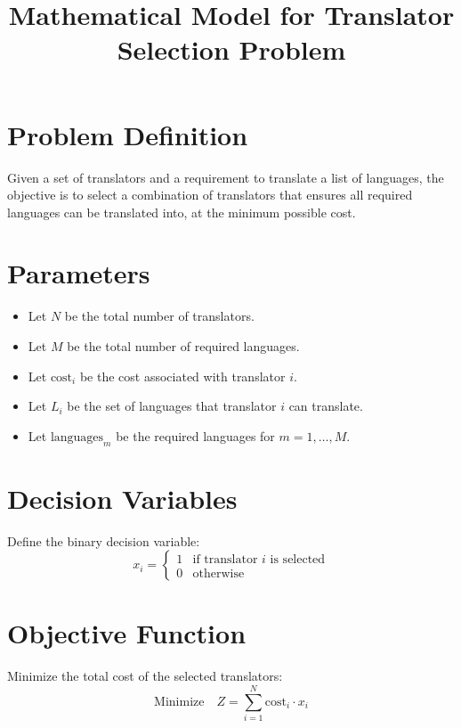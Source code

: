 \documentclass{article}
\begin{document}
\title{Mathematical Model for Translator Selection Problem}
\author{}
\date{}
\maketitle

\section*{Problem Definition}

Given a set of translators and a requirement to translate a list of languages, the objective is to select a combination of translators that ensures all required languages can be translated into, at the minimum possible cost.

\section*{Parameters}

\begin{itemize}
    \item Let \( N \) be the total number of translators.
    \item Let \( M \) be the total number of required languages.
    \item Let \( \text{cost}_i \) be the cost associated with translator \( i \).
    \item Let \( L_i \) be the set of languages that translator \( i \) can translate.
    \item Let \( \text{languages}_m \) be the required languages for \( m = 1, \ldots, M \).
\end{itemize}

\section*{Decision Variables}

Define the binary decision variable:
\[
x_i = 
\begin{cases} 
1 & \text{if translator } i \text{ is selected} \\
0 & \text{otherwise}
\end{cases}
\]

\section*{Objective Function}

Minimize the total cost of the selected translators:
\[
\text{Minimize} \quad Z = \sum_{i=1}^{N} \text{cost}_i \cdot x_i
\]
\end{document}
